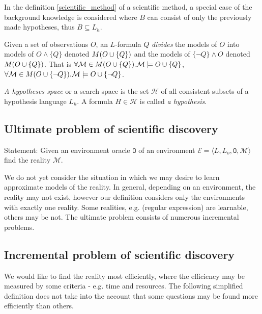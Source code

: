 \begin{remark}
In the definition \ref{scientific_method} of a scientific method, a special case of the background knowledge is considered where $B$ can consist of only the previously made hypotheses, thus $B \subseteq L_h$.
\end{remark}

\begin{note}
Given a set of observations $O$, an $L$-formula $Q$ \emph{divides} the models of $O$ into models of $O \wedge \{Q\}$ denoted $M(O \cup \{Q\})$ and the models of $\{\neg Q\} \wedge O$ denoted $M(O \cup \{Q\})$. That is $\forall \mathcal{M} \in M(O \cup \{Q\}). \mathcal{M} \models O \cup \{Q\}$,
$\forall \mathcal{M} \in M(O \cup \{\neg Q\}). \mathcal{M} \models O \cup \{\neg Q\}$.
\end{note}

\begin{defn}
\emph{A hypotheses space} or a search space is the set $\mathcal{H}$ of all consistent subsets of a hypothesis language $L_h$. A formula $H \in \mathcal{H}$ is called \emph{a hypothesis}.
\end{defn}

\subsection{Ultimate problem of scientific discovery}
Statement: Given an environment oracle $\mathtt{O}$ of an environment $\mathcal{E}=\langle L, L_o, \mathtt{O}, \mathcal{M} \rangle$ find the reality $\mathcal{M}$.

We do not yet consider the situation in which we may desire to learn approximate models of the reality. In general, depending on an environment, the reality may not exist, however our definition considers only the environments with exactly one reality. Some realities, e.g. (regular expression) are learnable, others may be not. The ultimate problem consists of numerous incremental problems.

\subsection{Incremental problem of scientific discovery}
We would like to find the reality most efficiently, where the efficiency may be measured by some criteria - e.g. time and resources. The following simplified definition does not take into the account that some questions may be found more efficiently than others.

